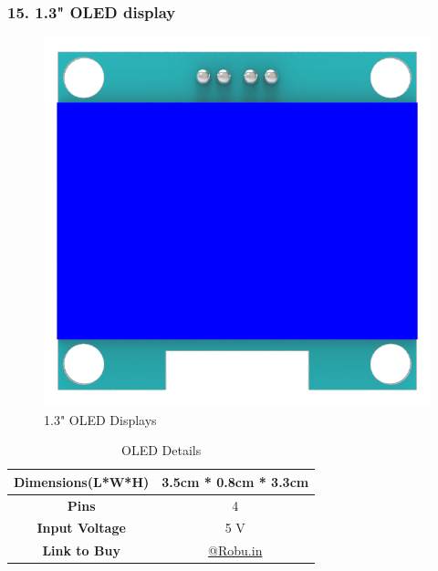 \documentclass[12pt,a4paper,oneside]{book}
\begin{document}
			\subsubsection*{15. 1.3" OLED display}
				\begin{figure}[H]
					\centering					
					\includegraphics[scale=1]{oled_front}
					\caption{1.3" OLED Displays}	 
				\end{figure}
				\begin{table}[H]
				\centering
				\def\arraystretch{1.5}
					\caption{OLED Details}
					\vspace{0.5cm}
					\begin{tabular}{|c||c|}
						\hline
						\textbf{Dimensions(L*W*H)} & 3.5cm * 0.8cm * 3.3cm\\\hline
						\textbf{Pins} & 4\\\hline
						\textbf{Input Voltage} & 5 V\\\hline
						\textbf{Link to Buy} & \href{https://robu.in/product/1-3-inch-i2c-iic-oled-lcd-module-4pin-with-vcc-gnd-white/}{@Robu.in}\\\hline
					\end{tabular}
				\end{table}
				\pagebreak
				
\end{document}
